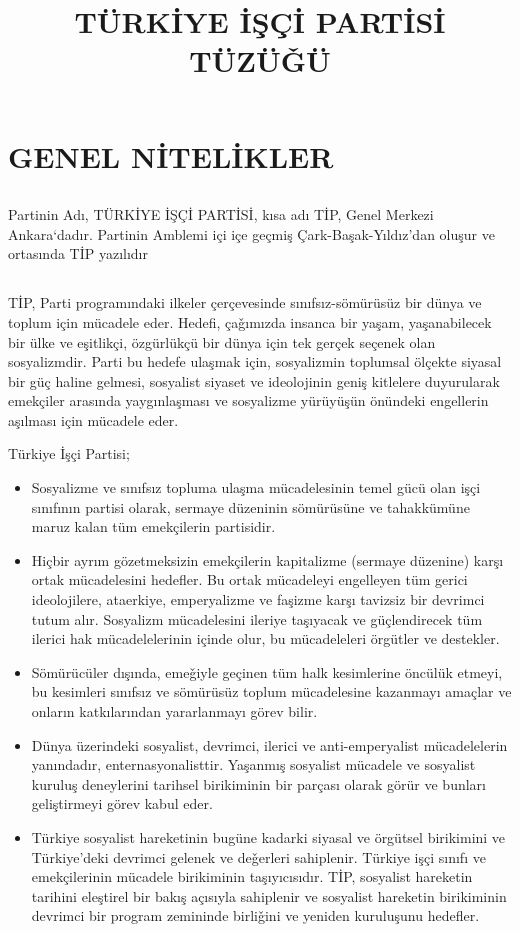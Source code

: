 \documentclass[11pt]{article} %
\title{TÜRKİYE İŞÇİ PARTİSİ
TÜZÜǦÜ}
\date{} %
\begin{document}
\maketitle

\section{GENEL NİTELİKLER}
\subsection{}
Partinin Adı, TÜRKİYE İŞÇİ PARTİSİ, kısa adı TİP, Genel Merkezi Ankara‘dadır. Partinin Amblemi içi içe geçmiş Çark-Başak-Yıldız’dan oluşur ve ortasında TİP yazılıdır
\subsection{}
TİP, Parti programındaki ilkeler çerçevesinde sınıfsız-sömürüsüz bir dünya ve toplum için mücadele eder. Hedefi, çaǧımızda insanca bir yaşam, yaşanabilecek bir ülke ve eşitlikçi, özgürlükçü bir dünya için tek gerçek seçenek olan sosyalizmdir.
Parti bu hedefe ulaşmak için, sosyalizmin toplumsal ölçekte siyasal bir güç haline gelmesi, sosyalist siyaset ve ideolojinin geniş kitlelere duyurularak emekçiler arasında yaygınlaşması ve sosyalizme yürüyüşün önündeki engellerin aşılması için mücadele eder.
\hfill \break

Türkiye İşçi Partisi;
\begin{itemize}
\item Sosyalizme ve sınıfsız topluma ulaşma mücadelesinin temel gücü olan işçi sınıfının partisi olarak, sermaye düzeninin sömürüsüne ve tahakkümüne maruz kalan tüm emekçilerin partisidir.
\item Hiçbir ayrım gözetmeksizin emekçilerin kapitalizme (sermaye düzenine) karşı ortak mücadelesini hedefler. Bu ortak mücadeleyi engelleyen tüm gerici ideolojilere, ataerkiye, emperyalizme ve faşizme karşı tavizsiz bir devrimci tutum alır. Sosyalizm mücadelesini ileriye taşıyacak ve güçlendirecek tüm ilerici hak mücadelelerinin içinde olur, bu mücadeleleri örgütler ve destekler.
\item Sömürücüler dışında, emeǧiyle geçinen tüm halk kesimlerine öncülük etmeyi, bu kesimleri sınıfsız ve sömürüsüz toplum mücadelesine kazanmayı amaçlar ve onların katkılarından yararlanmayı görev bilir.
\item Dünya üzerindeki sosyalist, devrimci, ilerici ve anti-emperyalist mücadelelerin yanındadır, enternasyonalisttir. Yaşanmış sosyalist mücadele ve sosyalist kuruluş deneylerini tarihsel birikiminin bir parçası olarak görür ve bunları geliştirmeyi görev kabul eder.
\item Türkiye sosyalist hareketinin bugüne kadarki siyasal ve örgütsel birikimini ve Türkiye’deki devrimci gelenek ve deǧerleri sahiplenir. Türkiye işçi sınıfı ve emekçilerinin mücadele birikiminin taşıyıcısıdır. TİP, sosyalist hareketin tarihini eleştirel bir bakış açısıyla sahiplenir ve sosyalist hareketin birikiminin devrimci bir program zemininde birliǧini ve yeniden kuruluşunu hedefler.
\end{itemize}
\end{document}
